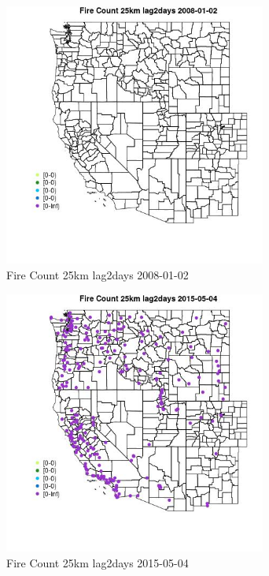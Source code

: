 \begin{figure} 
\centering  
\includegraphics[width=0.77\textwidth]{Code_Outputs/Report_ML_input_PM25_Step4_part_e_de_duplicated_aves_compiled_2019-05-18wNAs_MapObsFire_Count_25km_lag2days2008-01-02.jpg} 
\caption{\label{fig:Report_ML_input_PM25_Step4_part_e_de_duplicated_aves_compiled_2019-05-18wNAsMapObsFire_Count_25km_lag2days2008-01-02}Fire Count 25km lag2days 2008-01-02} 
\end{figure} 
 

\begin{figure} 
\centering  
\includegraphics[width=0.77\textwidth]{Code_Outputs/Report_ML_input_PM25_Step4_part_e_de_duplicated_aves_compiled_2019-05-18wNAs_MapObsFire_Count_25km_lag2days2015-05-04.jpg} 
\caption{\label{fig:Report_ML_input_PM25_Step4_part_e_de_duplicated_aves_compiled_2019-05-18wNAsMapObsFire_Count_25km_lag2days2015-05-04}Fire Count 25km lag2days 2015-05-04} 
\end{figure} 
 

